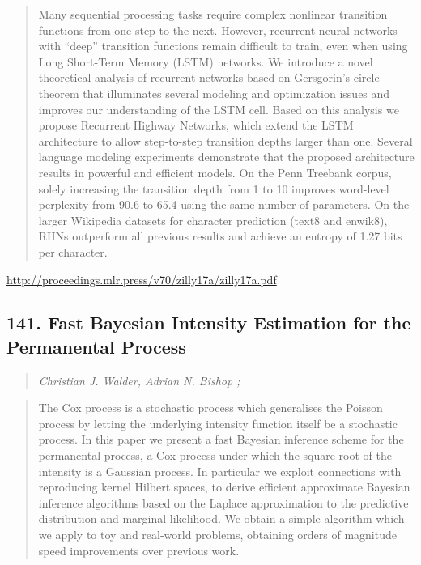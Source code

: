 \documentclass{article}
\begin{document}
\begin{quote}
    Many sequential processing tasks require complex nonlinear transition functions from one step to the next. However, recurrent neural networks with “deep” transition functions remain difficult to train, even when using Long Short-Term Memory (LSTM) networks. We introduce a novel theoretical analysis of recurrent networks based on Gersgorin’s circle theorem that illuminates several modeling and optimization issues and improves our understanding of the LSTM cell. Based on this analysis we propose Recurrent Highway Networks, which extend the LSTM architecture to allow step-to-step transition depths larger than one. Several language modeling experiments demonstrate that the proposed architecture results in powerful and efficient models. On the Penn Treebank corpus, solely increasing the transition depth from 1 to 10 improves word-level perplexity from 90.6 to 65.4 using the same number of parameters. On the larger Wikipedia datasets for character prediction (text8 and enwik8), RHNs outperform all previous results and achieve an entropy of 1.27 bits per character.  
\end{quote}

\href{http://proceedings.mlr.press/v70/zilly17a/zilly17a.pdf}{http://proceedings.mlr.press/v70/zilly17a/zilly17a.pdf}

\subsection{141. Fast Bayesian Intensity Estimation for the Permanental Process}

\begin{quote}
\footnotesize{\textit{Christian J. Walder, Adrian N. Bishop ;}}

\end{quote}

\begin{quote}
    The Cox process is a stochastic process which generalises the Poisson process by letting the underlying intensity function itself be a stochastic process. In this paper we present a fast Bayesian inference scheme for the permanental process, a Cox process under which the square root of the intensity is a Gaussian process. In particular we exploit connections with reproducing kernel Hilbert spaces, to derive efficient approximate Bayesian inference algorithms based on the Laplace approximation to the predictive distribution and marginal likelihood. We obtain a simple algorithm which we apply to toy and real-world problems, obtaining orders of magnitude speed improvements over previous work.  
\end{quote}
\end{document}
